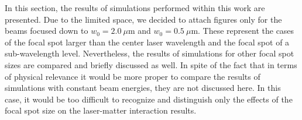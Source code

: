 In this section, the results of simulations performed within this work are presented. Due to the limited space, we decided to attach figures only for the beams focused down to $ w_0 = 2.0 \ \mu\mathrm{m} $ and $ w_0 = 0.5 \ \mu\mathrm{m} $. These represent the cases of the focal spot larger than the center laser wavelength and the focal spot of a sub-wavelength level. Nevertheless, the results of simulations for other focal spot sizes are compared and briefly discussed as well. In spite of the fact that in terms of physical relevance it would be more proper to compare the results of simulations with constant beam energies, they are not discussed here. In this case, it would be too difficult to recognize and distinguish only the effects of the focal spot size on the laser-matter interaction results.

